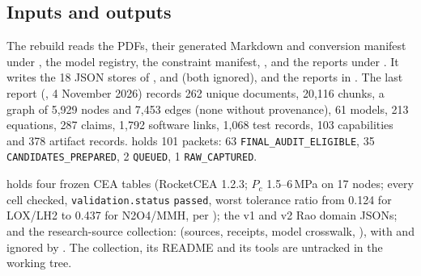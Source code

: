 \subsection{Inputs and outputs}
The rebuild reads the PDFs, their generated Markdown and conversion manifest under , the model registry, the constraint manifest, ,  and the reports under . It writes the 18 JSON stores of ,  and  (both ignored),  and the reports in . The last report (, 4 November 2026) records 262 unique documents, 20{,}116 chunks, a graph of 5{,}929 nodes and 7{,}453 edges (none without provenance), 61 models, 213 equations, 287 claims, 1{,}792 software links, 1{,}068 test records, 103 capabilities and 378 artifact records.  holds 101 packets: 63 \texttt{FINAL\_AUDIT\_ELIGIBLE}, 35 \texttt{CANDIDATES\_PREPARED}, 2 \texttt{QUEUED}, 1 \texttt{RAW\_CAPTURED}.

 holds four frozen CEA tables (RocketCEA 1.2.3; $P_c$ 1.5--6\,MPa on 17 nodes; every cell checked, \texttt{validation.status} \texttt{passed}, worst tolerance ratio from 0.124 for LOX/LH2 to 0.437 for N2O4/MMH, per ); the v1 and v2 Rao domain JSONs; and the research-source collection:  (sources, receipts, model crosswalk, ), with  and  ignored by . The collection, its README and its tools are untracked in the working tree.

